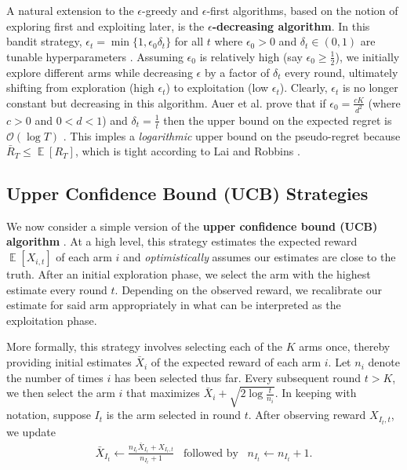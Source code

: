 \documentclass[12pt]{article}
\DeclareMathOperator*{\E}{\mathbb{E}}
\begin{document}
A natural extension to the $\epsilon$-greedy and $\epsilon$-first algorithms, based on the notion of exploring first and exploiting later, is the \textbf{$\epsilon$-decreasing algorithm}. In this bandit strategy, $\epsilon_{t}=\min\{1,\epsilon_{0}\delta_{t}\}$ for all $t$ where $\epsilon_{0}>0$ and $\delta_{t}\in(0,1)$ are tunable hyperparameters \cite{sutton1998}. Assuming $\epsilon_{0}$ is relatively high (say $\epsilon_{0}\geq\frac{1}{2}$), we initially explore different arms while decreasing $\epsilon$ by a factor of $\delta_{t}$ every round, ultimately shifting from exploration (high $\epsilon_{t}$) to exploitation (low $\epsilon_{t}$). Clearly, $\epsilon_{t}$ is no longer constant but decreasing in this algorithm. Auer et al. prove that if $\epsilon_{0}=\frac{cK}{d^{2}}$ (where $c>0$ and $0<d<1$) and $\delta_{t}=\frac{1}{t}$ then the upper bound on the expected regret is $\mathcal{O}(\log T)$ \cite{auer2002}. This imples a \textit{logarithmic} upper bound on the pseudo-regret because $\bar{R}_{T}\leq\E[R_{T}]$, which is tight according to Lai and Robbins \cite{lai1985}.

\subsection{Upper Confidence Bound (UCB) Strategies}

We now consider a simple version of the \textbf{upper confidence bound (UCB) algorithm} \cite{auer2002}. At a high level, this strategy estimates the expected reward $\E[X_{i,t}]$ of each arm $i$ and \textit{optimistically} assumes our estimates are close to the truth. After an initial exploration phase, we select the arm with the highest estimate every round $t$. Depending on the observed reward, we recalibrate our estimate for said arm appropriately in what can be interpreted as the exploitation phase.

More formally, this strategy involves selecting each of the $K$ arms once, thereby providing initial estimates $\bar{X}_{i}$ of the expected reward of each arm $i$. Let $n_{i}$ denote the number of times $i$ has been selected thus far. Every subsequent round $t>K$, we then select the arm $i$ that maximizes $\bar{X}_{i}+\sqrt{2\log\frac{t}{n_{i}}}$. In keeping with notation, suppose $I_{t}$ is the arm selected in round $t$. After observing reward $X_{I_{t},t}$, we update
\begin{align}
\bar{X}_{I_{t}}\leftarrow\frac{n_{I_{t}}\bar{X}_{I_{t}}+X_{I_{t},t}}{n_{I_{t}}+1}\,\,\,\text{ followed by }\,\,\,n_{I_{t}}\leftarrow n_{I_{t}}+1.
\end{align}
\end{document}
